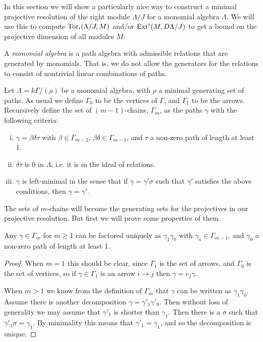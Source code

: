 \cite{GKK91, IgZa90}

In this section we will show a particularly nice way to construct a minimal projective resolution of the right module $\Lambda / J$ for a monomial algebra $\Lambda$. We will use this to compute $\operatorname{Tor}_i(\Lambda /J, M)$ and/or $\operatorname{Ext}^i(M, D\Lambda/J)$ to get a bound on the projective dimension of all modules $M$.

\begin{defn}
	A \emph{monomial algebra} is a path algebra with admissible relations that are generated by monomials. That is, we do not allow the generators for the relations to consist of nontrivial linear combinations of paths.
\end{defn}
\begin{defn}[$m$-chains]\cite{GKK91}
	Let $\Lambda = k\Gamma / (\rho)$ be a monomial algebra, with $\rho$ a minimal generating set of paths. As usual we define $\Gamma_0$ to be the vertices of $\Gamma$, and $\Gamma_1$ to be the arrows. Recursively define the set of $(m-1)$-chains, $\Gamma_m$, as the paths $\gamma$ with the following criteria:
	\begin{enumerate}[i)]
		\item $\gamma = \beta\delta\tau$ with $\beta \in \Gamma_{m-2}$, $\beta\delta \in \Gamma_{m-1}$, and $\tau$ a non-zero path of length at least 1.
		\item $\delta\tau$ is 0 in $\Lambda$, i.e. it is in the ideal of relations.
		\item $\gamma$ is left-minimal in the sense that if $\gamma = \gamma' \sigma$ such that $\gamma'$ satisfies the above conditions, then $\gamma = \gamma'$.
	\end{enumerate}
\end{defn}

The sets of $m$-chains will become the generating sets for the projectives in our projective resolution. But first we will prove some properties of them.

\begin{lemma}
	Any $\gamma\in \Gamma_m$ for $m \geq 1$ can be factored uniquely as $\gamma_1\gamma_0$ with $\gamma_1 \in \Gamma_{m-1}$, and $\gamma_0$ a non-zero path of length at least 1.
	\begin{proof}
		When $m=1$ this should be clear, since $\Gamma_1$ is the set of arrows, and $\Gamma_0$ is the set of vertices, so if $\gamma \in \Gamma_1$ is an arrow $i\to j$ then $\gamma = e_j\gamma$.
		
		When $m > 1$ we know from the definition of $\Gamma_m$ that $\gamma$ can be written as $\gamma_1\gamma_0$. Assume there is another decomposition $\gamma = \gamma'_1\gamma'_0$. Then without loss of generality we may assume that $\gamma'_1$ is shorter than $\gamma_1$. Then there is a $\sigma$ such that $\gamma'_1\sigma = \gamma_1$. By minimality this means that $\gamma'_1=\gamma_1$, and so the decomposition is unique.
	\end{proof} 
\end{lemma} 

